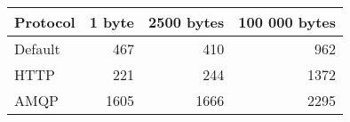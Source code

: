 \begin{tabularx}{\textwidth}{lrrr}
\hline
 Protocol   &   1 byte &   2500 bytes &   100 000 bytes \\
\hline
 Default    &      467 &          410 &             962 \\
 HTTP       &      221 &          244 &            1372 \\
 AMQP       &     1605 &         1666 &            2295 \\
\hline
\end{tabularx}